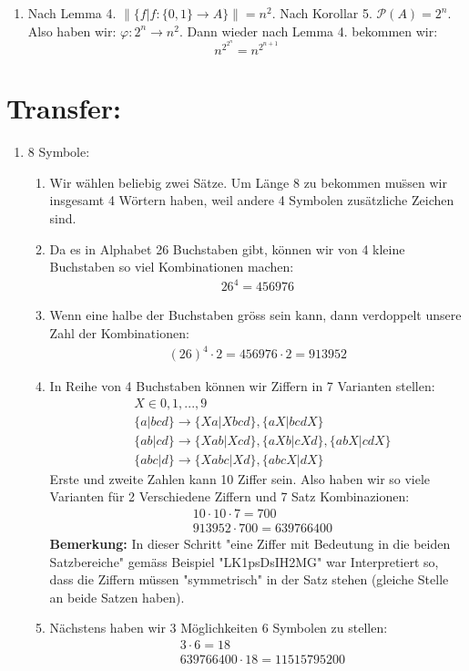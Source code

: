 \begin{enumerate}[label=(\alph*)]
		\item Nach Lemma 4. $\|\{ f|f:\{0,1\} \to A \}\| = n^2$. 
		Nach Korollar 5. $\mathcal{P}(A) = 2^n$. \\ Also haben wir: $\varphi : 2^n \to n^2$. Dann wieder nach Lemma 4. bekommen wir: \[n^{2^{2^n}} = n^{2^{n+1}}\]
	\end{enumerate} 
	
	\section*{Transfer:}
	\begin{enumerate}[label=(\alph*)]
		\item 8 Symbole:
		\begin{enumerate}[label=\bfseries Schritt \arabic*:]
			\item Wir w\"ahlen beliebig zwei S\"atze. Um L\"ange 8 zu bekommen mu\"ssen wir insgesamt 4 W\"ortern haben,
			weil andere 4 Symbolen zus\"atzliche Zeichen sind.

			\item Da es in Alphabet 26 Buchstaben gibt, k\"onnen wir von 4 kleine Buchstaben so viel Kombinationen machen:
			\begin{align*}
				26^4=456976
			\end{align*}

			\item Wenn eine halbe der Buchstaben gr\"oss sein kann, dann verdoppelt unsere Zahl der Kombinationen:
			\begin{align*}
				(26)^4\cdot2=456976\cdot2=913952
			\end{align*}

			\item In Reihe von 4 Buchstaben k\"onnen wir Ziffern in 7 Varianten stellen:
			\begin{align*}
				& X \in {0,1,...,9} \\
				& \{a|bcd\} \to \{Xa|Xbcd\},\{aX|bcdX\} \\
				& \{ab|cd\} \to \{Xab|Xcd\},\{aXb|cXd\}, \{abX|cdX\} \\
				& \{abc|d\} \to \{Xabc|Xd\},\{abcX|dX\}
			\end{align*}
			Erste und zweite Zahlen kann 10 Ziffer sein. Also haben wir so viele Varianten f\"ur 2 Verschiedene 
			Ziffern und 7 Satz Kombinazionen:
			\begin{align*}
				& 10\cdot10\cdot7 = 700 \\
				& 913952\cdot700 = 639766400
			\end{align*}
			\textbf{Bemerkung:} In dieser Schritt "eine Ziffer mit Bedeutung in die beiden Satzbereiche" gem\"ass 
			Beispiel "LK1psDsIH2MG" war Interpretiert so, dass die Ziffern m\"ussen "symmetrisch" in der Satz stehen
			(gleiche Stelle an beide Satzen haben). 
			\item N\"achstens haben wir 3 M\"oglichkeiten 6 Symbolen zu stellen:
			\begin{align*}
				& 3\cdot6=18 \\
				& 639766400\cdot18 = 11515795200
			\end{align*}


\end{enumerate}
\end{enumerate}
